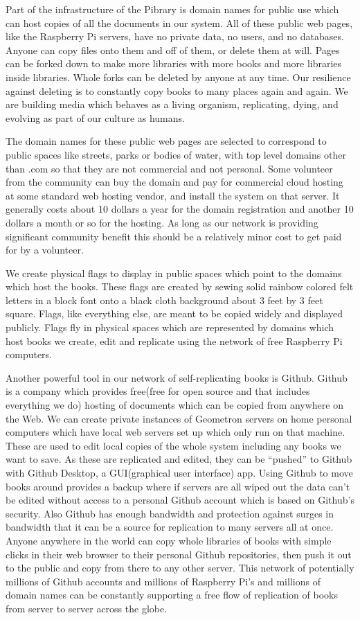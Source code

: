 Part of the infrastructure of the Pibrary is domain names for public use
which can host copies of all the documents in our system. All of these
public web pages, like the Raspberry Pi servers, have no private data,
no users, and no databases. Anyone can copy files onto them and off of
them, or delete them at will. Pages can be forked down to make more
libraries with more books and more libraries inside libraries. Whole
forks can be deleted by anyone at any time. Our resilience against
deleting is to constantly copy books to many places again and again. We
are building media which behaves as a living organism, replicating,
dying, and evolving as part of our culture as humans.

The domain names for these public web pages are selected to correspond
to public spaces like streets, parks or bodies of water, with top level
domains other than .com so that they are not commercial and not
personal. Some volunteer from the community can buy the domain and pay
for commercial cloud hosting at some standard web hosting vendor, and
install the system on that server. It generally costs about 10 dollars a
year for the domain registration and another 10 dollars a month or so
for the hosting. As long as our network is providing significant
community benefit this should be a relatively minor cost to get paid for
by a volunteer.

We create physical flags to display in public spaces which point to the
domains which host the books. These flags are created by sewing solid
rainbow colored felt letters in a block font onto a black cloth
background about 3 feet by 3 feet square. Flags, like everything else,
are meant to be copied widely and displayed publicly. Flags fly in
physical spaces which are represented by domains which host books we
create, edit and replicate using the network of free Raspberry Pi
computers.

Another powerful tool in our network of self-replicating books is
Github. Github is a company which provides free(free for open source and
that includes everything we do) hosting of documents which can be copied
from anywhere on the Web. We can create private instances of Geometron
servers on home personal computers which have local web servers set up
which only run on that machine. These are used to edit local copies of
the whole system including any books we want to save. As these are
replicated and edited, they can be ``pushed'' to Github with Github
Desktop, a GUI(graphical user interface) app. Using Github to move books
around provides a backup where if servers are all wiped out the data
can't be edited without access to a personal Github account which is
based on Github's security. Also Github has enough bandwidth and
protection against surges in bandwidth that it can be a source for
replication to many servers all at once. Anyone anywhere in the world
can copy whole libraries of books with simple clicks in their web
browser to their personal Github repositories, then push it out to the
public and copy from there to any other server. This network of
potentially millions of Github accounts and millions of Raspberry Pi's
and millions of domain names can be constantly supporting a free flow of
replication of books from server to server across the globe.

